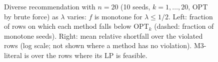 \begin{figure}[t]
\caption{Diverse recommendation with $n = 20$ (10 seeds, $k = 1,\dots,20$, OPT by brute force) as $\lambda$ varies: $f$ is monotone for $\lambda \le 1/2$. Left: fraction of rows on which each method falls below OPT$_k$ (dashed: fraction of monotone seeds). Right: mean relative shortfall over the violated rows (log scale; not shown where a method has no violation). M3-literal is over the rows where its LP is feasible.}
\label{fig:violations-lambda}
\end{figure}

